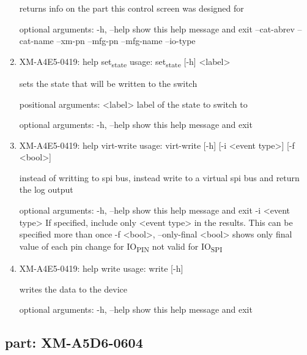 \documentclass[11pt]{article}
\begin{document}
\begin{enumerate}
returns info on the part this control screen was designed for

optional arguments:
  -h, --help   show this help message and exit
  --cat-abrev
  --cat-name
  --xm-pn
  --mfg-pn
  --mfg-name
  --io-type

\item XM-A4E5-0419: help set\textsubscript{state}
\label{sec:org6a89cf7}
usage: set\textsubscript{state} [-h] <label>

sets the state that will be written to the switch

positional arguments:
  <label>     label of the state to switch to

optional arguments:
  -h, --help  show this help message and exit

\item XM-A4E5-0419: help virt-write
\label{sec:org072776c}
usage: virt-write [-h] [-i <event type>] [-f <bool>]

instead of writting to spi bus, instead write to a virtual spi bus and return
the log output

optional arguments:
  -h, --help            show this help message and exit
  -i <event type>       If specified, include only <event type> in the
                        results. This can be specified more than once
  -f <bool>, --only-final <bool>
                        shows only final value of each pin change for IO\textsubscript{PIN}
                        not valid for IO\textsubscript{SPI}

\item XM-A4E5-0419: help write
\label{sec:org0f7b269}
usage: write [-h]

writes the data to the device

optional arguments:
  -h, --help  show this help message and exit
\end{enumerate}

\subsection{part: XM-A5D6-0604}
\label{sec:org58bd7b9}
\end{document}
